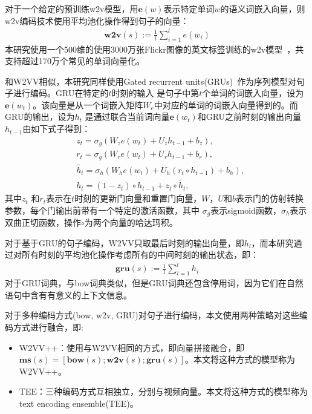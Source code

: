 对于一个给定的预训练w2v模型，用$\bm{\mathbf{e}}(w)$表示特定单词$w$的语义词嵌入向量，则w2v编码技术使用平均池化操作得到句子的向量：
\begin{equation}
    \label{eq:w2v}
    \begin{aligned}
        \bm{\mathbf{w2v}}(s) := \frac{1}{l}\sum^l_{i=1}e(w_i)
    \end{aligned}
\end{equation}
本研究使用一个500维的使用3000万张Flickr图像的英文标签训练的w2v模型~\cite{dong2018predicting}，共支持超过170万个常见的单词向量化。

和W2VV相似，本研究同样使用Gated recurrent units(GRUs)~\cite{cho2014learning}作为序列模型对句子进行编码。GRU在特定的$t$时刻的输入
是句子中第$t$个单词的词嵌入向量，设为$\bm{\mathbf{e}}(w_t)$。该向量是从一个词嵌入矩阵$W_e$中对应的单词的词嵌入向量得到的。而GRU的输出，设为$h_t$
是通过联合当前词向量$\bm{\mathbf{e}}(w_t)$和GRU之前时刻的输出向量$h_{t-1}$由如下式子得到：
\begin{equation}
    \label{eq:gru}
    \begin{aligned}
        & z_t = \sigma_g(W_z e(w_t) + U_z h_{t-1} + b_z), \\
        & r_t = \sigma_g(W_r e(w_t) + U_r h_{t-1} + b_r), \\
        & \widetilde{h_t} = \sigma_h(W_h e(w_t) + U_h (r_t \circ h_{t-1}) + b_h), \\
        & h_t = (1-z_t) \circ h_{t-1} + z_t \circ \widetilde{h_t},
    \end{aligned}
\end{equation}
其中$z_t$ 和$r_t$表示在$t$时刻的更新门向量和重置门向量，$W$，$U$和$b$表示门的仿射转换参数，每个门输出前带有一个特定的激活函数，其中
$\sigma_g$表示sigmoid函数，$\sigma_h$表示双曲正切函数，操作$\circ$为两个向量的哈达玛积。

对于基于GRU的句子编码，W2VV只取最后时刻的输出向量，即$h_l$，而本研究通过对所有时刻的平均池化操作考虑所有的中间时刻的输出状态，即：
\begin{equation}
    \label{eq:gru-mean}
    \begin{aligned}
        \bm{\mathbf{gru}}(s) := \frac{1}{l}\sum^l_{i=1}h_i
    \end{aligned}
\end{equation}
对于GRU词典，与bow词典类似，但是GRU词典还包含停用词，因为它们在自然语句中含有有意义的上下文信息。

对于多种编码方式(bow, w2v, GRU)对句子进行编码，本文使用两种策略对这些编码方式进行融合，即:
\begin{itemize}
    \item W2VV++：使用与W2VV相同的方式，即向量拼接融合，即$\bm{\mathbf{ms}}(s)=[\bm{\mathbf{bow}}(s);\bm{\mathbf{w2v}}(s);\bm{\mathbf{gru}}(s)]$。本文将这种方式的模型称为W2VV++。

    \item TEE：三种编码方式互相独立，分别与视频向量。本文将这种方式的模型称为text encoding ensemble(TEE)。
\end{itemize}

